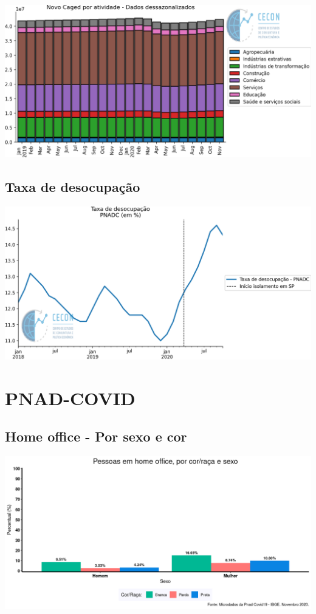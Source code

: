 \documentclass{SelfArx}
\begin{document}
\begin{center}
\includegraphics[width=.9\linewidth]{./figs/Emprego/NovoCaged_Atividade.png}
\end{center}



\subsection*{Taxa de desocupação}
\label{sec:orgd7666a0}

\begin{center}
\includegraphics[width=.9\linewidth]{./figs/Emprego/TaxaDesocupacao.png}
\end{center}

\section*{PNAD-COVID}
\label{sec:org0d0c636}
\subsection*{Home office - Por sexo e cor}
\label{sec:org8fdebcb}




\begin{center}
\includegraphics[width=.9\linewidth]{./figs/PNAD_COVID/home_sexo_cor.png}
\end{center}
\end{document}
